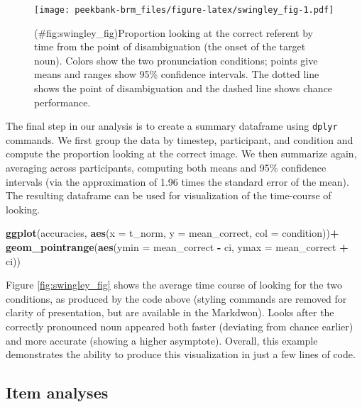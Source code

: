 \documentclass[
  english,
  man,floatsintext]{apa6}
\newenvironment{Shaded}{\begin{snugshade}}{\end{snugshade}}
\newcommand{\DataTypeTok}[1]{\textcolor[rgb]{0.13,0.29,0.53}{#1}}
\newcommand{\KeywordTok}[1]{\textcolor[rgb]{0.13,0.29,0.53}{\textbf{#1}}}
\newcommand{\NormalTok}[1]{#1}
\newcommand{\OperatorTok}[1]{\textcolor[rgb]{0.81,0.36,0.00}{\textbf{#1}}}
\newcommand{\StringTok}[1]{\textcolor[rgb]{0.31,0.60,0.02}{#1}}
\begin{document}
\begin{figure}
\centering
\texttt{[image: peekbank-brm\_files/figure-latex/swingley\_fig-1.pdf]}
\caption{(\#fig:swingley\_fig)Proportion looking at the correct referent by time from the point of disambiguation (the onset of the target noun). Colors show the two pronunciation conditions; points give means and ranges show 95\% confidence intervals. The dotted line shows the point of disambiguation and the dashed line shows chance performance.}
\end{figure}

The final step in our analysis is to create a summary dataframe using \texttt{dplyr} commands. We first group the data by timestep, participant, and condition and compute the proportion looking at the correct image. We then summarize again, averaging across participants, computing both means and 95\% confidence intervals (via the approximation of 1.96 times the standard error of the mean). The resulting dataframe can be used for visualization of the time-course of looking.

\begin{Shaded}
\begin{Highlighting}[]
\KeywordTok{ggplot}\NormalTok{(accuracies, }\KeywordTok{aes}\NormalTok{(}\DataTypeTok{x =}\NormalTok{ t_norm, }\DataTypeTok{y =}\NormalTok{ mean_correct, }\DataTypeTok{col =}\NormalTok{ condition))}\OperatorTok{+}
\StringTok{  }\KeywordTok{geom_pointrange}\NormalTok{(}\KeywordTok{aes}\NormalTok{(}\DataTypeTok{ymin =}\NormalTok{ mean_correct }\OperatorTok{-}\StringTok{ }\NormalTok{ci, }
                      \DataTypeTok{ymax =}\NormalTok{ mean_correct }\OperatorTok{+}\StringTok{ }\NormalTok{ci))}
\end{Highlighting}
\end{Shaded}

Figure \ref{fig:swingley_fig} shows the average time course of looking for the two conditions, as produced by the code above (styling commands are removed for clarity of presentation, but are available in the Markdwon). Looks after the correctly pronounced noun appeared both faster (deviating from chance earlier) and more accurate (showing a higher asymptote). Overall, this example demonstrates the ability to produce this visualization in just a few lines of code.

\hypertarget{item-analyses}{%
\subsection{Item analyses}\label{item-analyses}}
\end{document}
